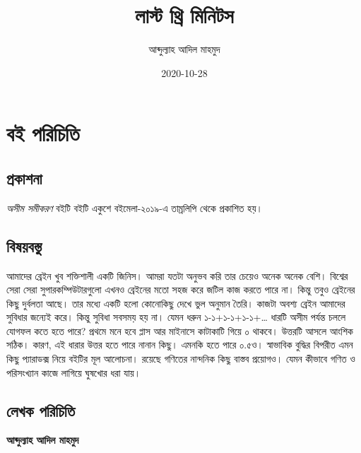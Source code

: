 \documentclass[
]{book}
\title{লাস্ট থ্রি মিনিটস}
\author{আব্দুল্যাহ আদিল মাহমুদ}
\date{2020-10-28}
\begin{document}
\maketitle

{
\setcounter{tocdepth}{1}
\tableofcontents
}
\hypertarget{ux9acux987-ux9aaux9b0ux9bfux99aux9bfux9a4ux9bf}{%
\chapter*{বই পরিচিতি}\label{ux9acux987-ux9aaux9b0ux9bfux99aux9bfux9a4ux9bf}}

\hypertarget{ux9aaux9cdux9b0ux995ux9beux9b6ux9a8ux9be}{%
\section{প্রকাশনা}\label{ux9aaux9cdux9b0ux995ux9beux9b6ux9a8ux9be}}

\emph{অসীম সমীকরণ} বইটি বইটি একুশে বইমেলা-২০১৯-এ তাম্রলিপি থেকে প্রকাশিত হয়।

\hypertarget{ux9acux9bfux9b7ux9dfux9acux9b8ux9cdux9a4ux9c1}{%
\section{বিষয়বস্তু}\label{ux9acux9bfux9b7ux9dfux9acux9b8ux9cdux9a4ux9c1}}

আমাদের ব্রেইন খুব শক্তিশালী একটি জিনিস। আমরা যতটা অনুভব করি তার চেয়েও অনেক অনেক বেশি। বিশ্বের সেরা সেরা সুপারকম্পিউটারগুলো এখনও ব্রেইনের মতো সহজ করে জটিল কাজ করতে পারে না। কিন্তু তবুও ব্রেইনের কিছু দুর্বলতা আছে। তার মধ্যে একটি হলো কোনোকিছু দেখে ভুল অনুমান তৈরি। কাজটা অবশ্য ব্রেইন আমাদের সুবিধার জন্যেই করে। কিন্তু সুবিধা সবসময় হয় না। যেমন ধরুন ১-১+১-১+১-১+\ldots{} ধারটি অসীম পর্যন্ত চললে যোগফল কতে হতে পারে? প্রথমে মনে হবে প্লাস আর মাইনাসে কাটাকাটি গিয়ে ০ থাকবে। উত্তরটি আসলে আংশিক সঠিক। কারণ, এই ধারার উত্তর হতে পারে নানান কিছু। এমনকি হতে পারে ০.৫ও। স্বাভাবিক বুদ্ধির বিপরীত এমন কিছু প্যারাডক্স নিয়ে বইটির মূল আলোচনা। রয়েছে গণিতের নান্দনিক কিছু বাস্তব প্রয়োগও। যেমন কীভাবে গণিত ও পরিসংখ্যান কাজে লাগিয়ে ঘুষখোর ধরা যায়।

\hypertarget{ux9b2ux9c7ux996ux995-ux9aaux9b0ux9bfux99aux9bfux9a4ux9bf}{%
\section{লেখক পরিচিতি}\label{ux9b2ux9c7ux996ux995-ux9aaux9b0ux9bfux99aux9bfux9a4ux9bf}}

\textbf{আব্দুল্যাহ আদিল মাহমুদ}
\end{document}
